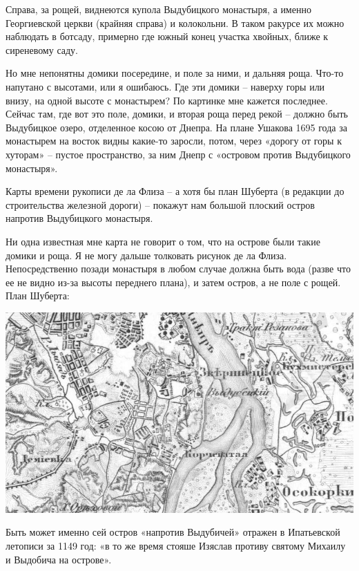 Справа, за рощей, виднеются купола Выдубицкого монастыря, а именно Георгиевской церкви (крайняя справа) и колокольни. В таком ракурсе их можно наблюдать в ботсаду, примерно где южный конец участка хвойных, ближе к сиреневому саду. 

Но мне непонятны домики посередине, и поле за ними, и дальняя роща. Что-то напутано с высотами, или я ошибаюсь. Где эти домики – наверху горы или внизу, на одной высоте с монастырем? По картинке мне кажется последнее. Сейчас там, где вот это поле, домики, и вторая роща перед рекой – должно быть Выдубицкое озеро, отделенное косою от Днепра. На плане Ушакова 1695 года за монастырем на восток видны какие-то заросли, потом, через «дорогу от горы к хуторам» – пустое пространство, за ним Днепр с «островом против Выдубицкого монастыря». 

Карты времени рукописи де ла Флиза – а хотя бы план Шуберта (в редакции до строительства железной дороги) – покажут нам большой плоский остров напротив Выдубицкого монастыря.

Ни одна известная мне карта не говорит о том, что на острове были такие домики и роща. Я не могу дальше толковать рисунок де ла Флиза. Непосредственно позади монастыря в любом случае должна быть вода (разве что ее не видно из-за высоты переднего плана), и затем остров, а не поле с рощей. План Шуберта:

\begin{center}
\includegraphics[width=\linewidth]{chast-vosp/zver/vyd-ostrov-01.jpg}
\end{center}

Быть может именно сей остров «напротив Выдубичей» отражен в Ипатьевской летописи за 1149 год: «в то же время стояше Изяслав противу святому Михаилу и Выдобича на острове».



